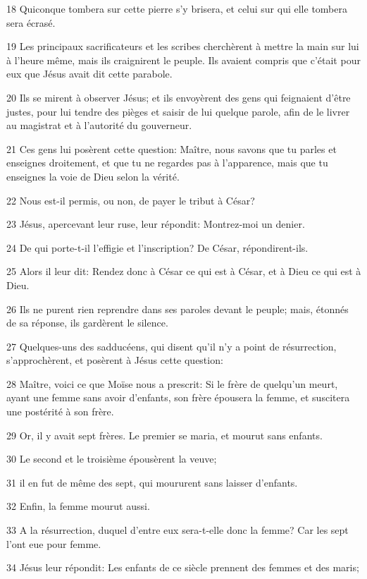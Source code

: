 \par 18 Quiconque tombera sur cette pierre s'y brisera, et celui sur qui elle tombera sera écrasé.
\par 19 Les principaux sacrificateurs et les scribes cherchèrent à mettre la main sur lui à l'heure même, mais ils craignirent le peuple. Ils avaient compris que c'était pour eux que Jésus avait dit cette parabole.
\par 20 Ils se mirent à observer Jésus; et ils envoyèrent des gens qui feignaient d'être justes, pour lui tendre des pièges et saisir de lui quelque parole, afin de le livrer au magistrat et à l'autorité du gouverneur.
\par 21 Ces gens lui posèrent cette question: Maître, nous savons que tu parles et enseignes droitement, et que tu ne regardes pas à l'apparence, mais que tu enseignes la voie de Dieu selon la vérité.
\par 22 Nous est-il permis, ou non, de payer le tribut à César?
\par 23 Jésus, apercevant leur ruse, leur répondit: Montrez-moi un denier.
\par 24 De qui porte-t-il l'effigie et l'inscription? De César, répondirent-ils.
\par 25 Alors il leur dit: Rendez donc à César ce qui est à César, et à Dieu ce qui est à Dieu.
\par 26 Ils ne purent rien reprendre dans ses paroles devant le peuple; mais, étonnés de sa réponse, ils gardèrent le silence.
\par 27 Quelques-uns des sadducéens, qui disent qu'il n'y a point de résurrection, s'approchèrent, et posèrent à Jésus cette question:
\par 28 Maître, voici ce que Moïse nous a prescrit: Si le frère de quelqu'un meurt, ayant une femme sans avoir d'enfants, son frère épousera la femme, et suscitera une postérité à son frère.
\par 29 Or, il y avait sept frères. Le premier se maria, et mourut sans enfants.
\par 30 Le second et le troisième épousèrent la veuve;
\par 31 il en fut de même des sept, qui moururent sans laisser d'enfants.
\par 32 Enfin, la femme mourut aussi.
\par 33 A la résurrection, duquel d'entre eux sera-t-elle donc la femme? Car les sept l'ont eue pour femme.
\par 34 Jésus leur répondit: Les enfants de ce siècle prennent des femmes et des maris;
